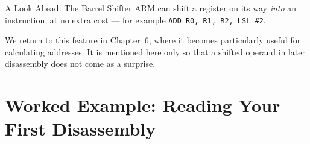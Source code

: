 \documentclass[9pt,aspectratio=169,xcolor=table]{beamer}
\begin{document}
\begin{frame}{A Look Ahead: The Barrel Shifter}
    \leavevmode
    {\small ARM can shift a register on its way \emph{into} an
    instruction, at no extra cost --- for example
    \texttt{ADD R0, R1, R2, LSL \#2}.}

    \vspace{3mm}
    {\small We return to this feature in Chapter~6, where it becomes
    particularly useful for calculating addresses. It is mentioned here
    only so that a shifted operand in later disassembly does not come as
    a surprise.}
\end{frame}

\section{Worked Example: Reading Your First Disassembly}
\end{document}
